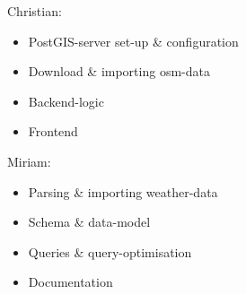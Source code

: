 \documentclass[paper=a4, fontsize=11pt]{article} %
\numberwithin{equation}{section} %
\numberwithin{figure}{section} %
\numberwithin{table}{section} %
\begin{document}
Christian:
	\begin{itemize}
    	\item PostGIS-server set-up \& configuration
    	\item Download \& importing osm-data
   		\item Backend-logic
    	\item Frontend
    \end{itemize}
    
Miriam:
	\begin{itemize}
    	\item Parsing \& importing weather-data
    	\item Schema \& data-model
    	\item Queries \& query-optimisation
    	\item Documentation
    \end{itemize}

\newpage
\end{document}
